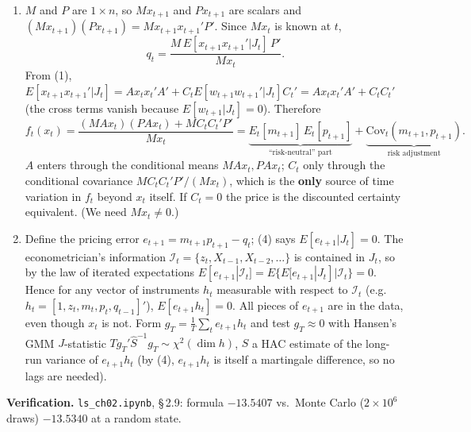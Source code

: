 \documentclass[12pt, letterpaper]{article}
\newcommand{\Cov}{\mathrm{Cov}}
\newcommand{\nb}[1]{\texttt{ls\_ch02.ipynb}, \S\,#1}
\begin{document}
\begin{tcolorbox}[oddbox,title={Exercise 2.9 \quad Pricing with a Stochastic Discount Factor}]
\begin{enumerate}
\item $M$ and $P$ are $1\times n$, so $Mx_{t+1}$ and $Px_{t+1}$ are scalars and
$(Mx_{t+1})(Px_{t+1})=Mx_{t+1}x_{t+1}'P'$. Since $Mx_t$ is known at $t$,
\[
q_t=\frac{M\,E[x_{t+1}x_{t+1}'|J_t]\,P'}{Mx_t}.
\]
From (1), $E[x_{t+1}x_{t+1}'|J_t]=Ax_tx_t'A'+C_tE[w_{t+1}w_{t+1}'|J_t]C_t'=Ax_tx_t'A'+C_tC_t'$ (the
cross terms vanish because $E[w_{t+1}|J_t]=0$). Therefore
\[
\boxed{f_t(x_t)=\frac{(MAx_t)(PAx_t)+MC_tC_t'P'}{Mx_t}}
=\underbrace{E_t[m_{t+1}]\,E_t[p_{t+1}]}_{\text{``risk-neutral'' part}}+\underbrace{\Cov_t(m_{t+1},p_{t+1})}_{\text{risk adjustment}}.
\]
$A$ enters through the conditional means $MAx_t,PAx_t$; $C_t$ only through the conditional covariance
$MC_tC_t'P'/(Mx_t)$, which is the \textbf{only} source of time variation in $f_t$ beyond $x_t$ itself.
If $C_t=0$ the price is the discounted certainty equivalent. (We need $Mx_t\neq0$.)
\item Define the pricing error $e_{t+1}=m_{t+1}p_{t+1}-q_t$; (4) says $E[e_{t+1}|J_t]=0$. The
econometrician's information $\mathcal I_t=\{z_t,X_{t-1},X_{t-2},\dots\}$ is contained in $J_t$, so by
the law of iterated expectations $E[e_{t+1}|\mathcal I_t]=E\{E[e_{t+1}|J_t]|\mathcal I_t\}=0$. Hence
for any vector of instruments $h_t$ measurable with respect to $\mathcal I_t$ (e.g.\ $h_t=[1,z_t,
m_t,p_t,q_{t-1}]'$), $E[e_{t+1}h_t]=0$. All pieces of $e_{t+1}$ are in the data, even though $x_t$ is
not. Form $g_T=\frac1T\sum_te_{t+1}h_t$ and test $g_T\approx0$ with Hansen's GMM $J$-statistic
$Tg_T'\hat S^{-1}g_T\sim\chi^2(\dim h)$, $\hat S$ a HAC estimate of the long-run variance of
$e_{t+1}h_t$ (by (4), $e_{t+1}h_t$ is itself a martingale difference, so no lags are needed).
\end{enumerate}

\textbf{Verification.} \nb{2.9}: formula $-13.5407$ vs.\ Monte Carlo ($2\times10^6$ draws) $-13.5340$ at a random state. \checkmark
\end{tcolorbox}
\end{document}
